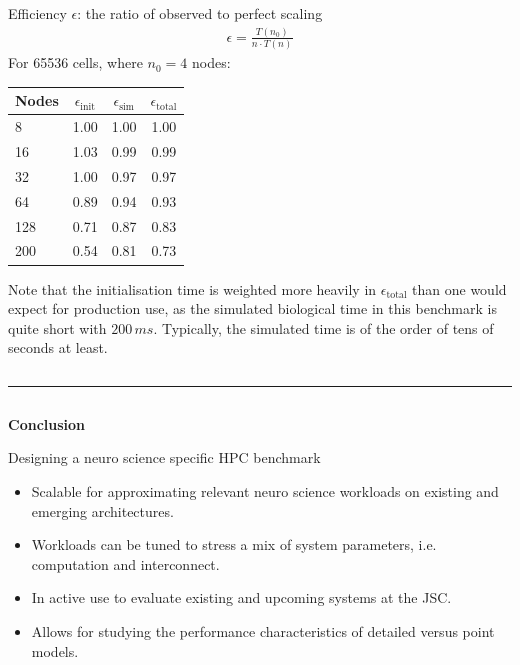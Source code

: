 \documentclass{beamer}
\begin{document}
\begin{frame}[t, fragile]
\begin{columns}[t]
\begin{column}[T]{0.25\textwidth}
      Efficiency $\epsilon$: the ratio of observed to perfect scaling
      \begin{align*}
        \epsilon = \frac{T(n_{0})}{n\cdot T(n)}
      \end{align*}
      For 65536 cells, where $n_{0}= 4$ nodes:
      \begin{center}
        \begin{tabular}{lccc}
          \toprule
          Nodes & $\epsilon_\mathrm{init}$ & $\epsilon_\mathrm{sim}$ & $\epsilon_\mathrm{total}$ \\
          \midrule
          8   & 1.00 & 1.00 & 1.00\\
          16  & 1.03 & 0.99 & 0.99\\
          32  & 1.00 & 0.97 & 0.97\\
          64  & 0.89 & 0.94 & 0.93\\
          128 & 0.71 & 0.87 & 0.83\\
          200 & 0.54 & 0.81 & 0.73\\
          \bottomrule
        \end{tabular}
      \end{center}
      Note that the initialisation time is weighted more heavily in
      $\epsilon_\mathrm{total}$ than one would expect for production use, as the
      simulated biological time in this benchmark is quite short with $200\,ms$.
      Typically, the simulated time is of the order of tens of seconds at least.
    \end{column}
  \end{columns}
  \vspace*{1ex}
  \textcolor{arbgrey}{\rule{\textwidth}{0.5ex}}
  \vspace*{-1ex}
  \begin{columns}[t]
    \begin{column}[T]{0.25\textwidth}
      \textbf{Conclusion}

      Designing a neuro science specific HPC benchmark
      \begin{itemize}
        \item Scalable for approximating relevant neuro science
              workloads on existing and emerging architectures.
        \item Workloads can be tuned to stress a mix of system parameters, i.e.
              computation and interconnect.
        \item In active use to evaluate existing and upcoming systems at the JSC.
        \item Allows for studying the performance characteristics of detailed versus point models.
      \end{itemize}


\end{column}
\end{columns}
\end{frame}
\end{document}
